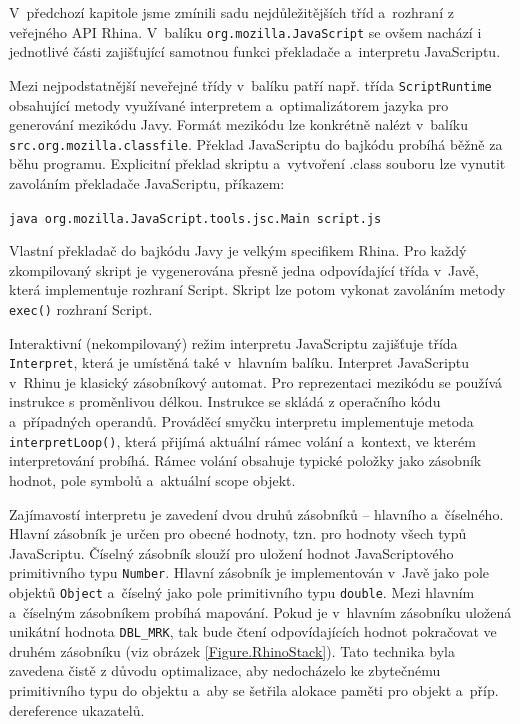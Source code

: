 V~předchozí kapitole jsme zmínili sadu nejdůležitějších tříd a~rozhraní z veřejného API Rhina. V~balíku \texttt{org.mozilla.JavaScript} se ovšem nachází i jednotlivé části zajišťující samotnou funkci překladače a~interpretu JavaScriptu.

Mezi nejpodstatnější neveřejné třídy v~balíku patří např. třída \texttt{ScriptRuntime} obsahující metody využívané interpretem a~optimalizátorem jazyka pro generování mezikódu Javy. Formát mezikódu lze konkrétně nalézt v~balíku \texttt{src.org.mozilla.classfile}. Překlad JavaScriptu do bajkódu probíhá běžně za běhu programu. Explicitní překlad skriptu a~vytvoření .class souboru lze vynutit zavoláním překladače JavaScriptu, příkazem:

\medskip
\centerline{\texttt{java org.mozilla.JavaScript.tools.jsc.Main script.js}}
\medskip

Vlastní překladač do bajkódu Javy je velkým specifikem Rhina. Pro každý zkompilovaný skript je vygenerována přesně jedna odpovídající třída v~Javě, která implementuje rozhraní Script. Skript lze potom vykonat zavoláním metody \texttt{exec()} rozhraní Script.

Interaktivní (nekompilovaný) režim interpretu JavaScriptu zajišťuje třída \texttt{Interpret}, která je umístěná také v~hlavním balíku. Interpret JavaScriptu v~Rhinu je klasický zásobníkový automat. Pro reprezentaci mezikódu se používá instrukce s proměnlivou délkou. Instrukce se skládá z operačního kódu a~případných operandů. Prováděcí smyčku interpretu implementuje metoda \texttt{interpretLoop()}, která přijímá aktuální rámec volání a~kontext, ve kterém interpretování probíhá. Rámec volání obsahuje typické položky jako zásobník hodnot, pole symbolů a~aktuální scope objekt.

Zajímavostí interpretu je zavedení dvou druhů zásobníků -- hlavního a~číselného. Hlavní zásobník je určen pro obecné hodnoty, tzn. pro hodnoty všech typů JavaScriptu. Číselný zásobník slouží pro uložení hodnot JavaScriptového primitivního typu \texttt{Number}. Hlavní zásobník je implementován v~Javě jako pole objektů \texttt{Object} a~číselný jako pole primitivního typu \texttt{double}. Mezi hlavním a~číselným zásobníkem probíhá mapování. Pokud je v~hlavním zásobníku uložená unikátní hodnota \texttt{DBL\_MRK}, tak bude čtení odpovídajících hodnot pokračovat ve druhém zásobníku (viz obrázek \ref{Figure.RhinoStack}). Tato technika byla zavedena čistě z důvodu optimalizace, aby nedocházelo ke zbytečnému  primitivního typu do objektu a~aby se šetřila alokace paměti pro objekt a~příp. dereference ukazatelů.

